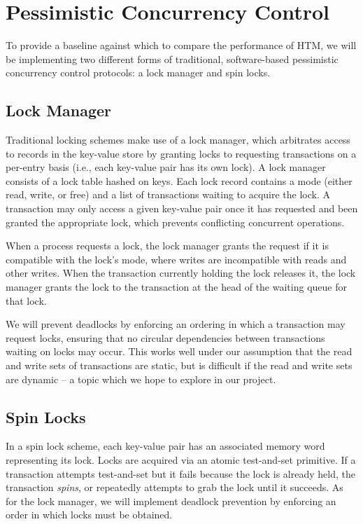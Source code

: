 \section{Pessimistic Concurrency Control} \label{sec:pessimistic}

To provide a baseline against which to compare the performance of HTM, we will
be implementing two different forms of traditional, software-based pessimistic
concurrency control protocols: a lock manager and spin locks.

\subsection{Lock Manager}

Traditional locking schemes make use of a lock manager, which arbitrates access
to records in the key-value store by granting locks to requesting transactions
on a per-entry basis (i.e., each key-value pair has its own lock). A lock
manager consists of a lock table hashed on keys. Each lock record contains a
mode (either read, write, or free) and a list of transactions waiting to acquire
the lock. A transaction may only access a given key-value pair once it has
requested and been granted the appropriate lock, which prevents conflicting
concurrent operations.

When a process requests a lock, the lock manager grants the request if it is
compatible with the lock's mode, where writes are incompatible with reads and
other writes.  When the transaction currently holding the lock releases it, the
lock manager grants the lock to the transaction at the head of the waiting
queue for that lock.

We will prevent deadlocks by enforcing an ordering in which a transaction may
request locks, ensuring that no circular dependencies between transactions
waiting on locks may occur. This works well under our assumption that the read
and write sets of transactions are static, but is difficult if the read and
write sets are dynamic -- a topic which we hope to explore in our project.\\

\subsection{Spin Locks}

In a spin lock scheme, each key-value pair has an associated memory word
representing its lock. Locks are acquired via an atomic test-and-set
primitive. If a transaction attempts test-and-set but it fails because the lock
is already held, the transaction \textit{spins}, or repeatedly attempts to grab
the lock until it succeeds. As for the lock manager, we will implement deadlock
prevention by enforcing an order in which locks must be obtained.

